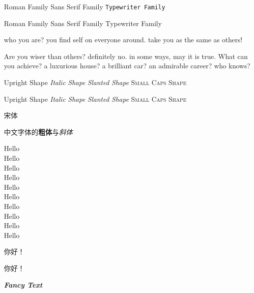\documentclass[12pt]{article}  %
\newcommand{\myfont}{\textit{\textbf{\textsf{Fancy Text}}}}  %
\begin{document}
    
    \textrm{Roman Family} \textsf{Sans Serif Family} \texttt{Typewriter Family}  %

    {\rmfamily Roman Family} {\sffamily Sans Serif Family} {\ttfamily Typewriter Family}

    {\sffamily who you are? you find self on everyone around. take you as the same as others!}

    {\ttfamily Are you wiser than others? definitely no. in some ways, may it is true. What can you achieve? a luxurious house? a brilliant car? an admirable career? who knows?}

    \textup{Upright Shape} \textit{Italic Shape} \textsl{Slanted Shape} \textsc{Small Caps Shape}

    {\upshape Upright Shape} {\itshape Italic Shape} {\slshape Slanted Shape} {\scshape Small Caps Shape}

    {\songti 宋体}   

    中文字体的\textbf{粗体}与\textit{斜体}  %

    {\tiny          Hello}\\
    {\scriptsize    Hello}\\
    {\footnotesize  Hello}\\
    {\small         Hello}\\
    {\normalsize    Hello}\\
    {\large         Hello}\\
    {\Large         Hello}\\
    {\LARGE         Hello}\\
    {\huge          Hello}\\
    {\Huge          Hello}

     你好！  %

     你好！  %

    \myfont
    
\end{document}
